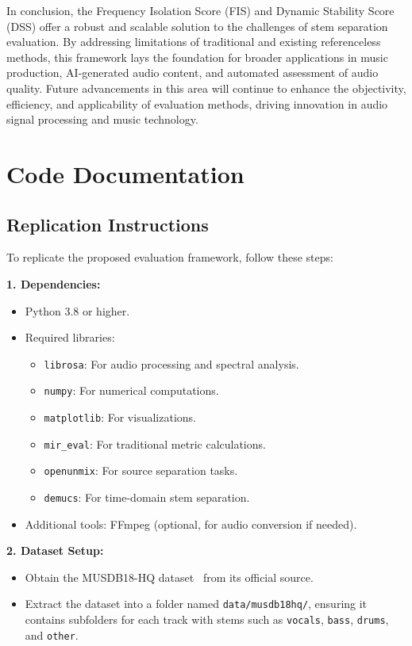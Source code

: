 \documentclass[10pt,twocolumn]{article}
\begin{document}
In conclusion, the Frequency Isolation Score (FIS) and Dynamic Stability Score (DSS) offer a robust and scalable solution to the challenges of stem separation evaluation. By addressing limitations of traditional and existing referenceless methods, this framework lays the foundation for broader applications in music production, AI-generated audio content, and automated assessment of audio quality. Future advancements in this area will continue to enhance the objectivity, efficiency, and applicability of evaluation methods, driving innovation in audio signal processing and music technology.


\section{Code Documentation}

\subsection{Replication Instructions}

To replicate the proposed evaluation framework, follow these steps:

\textbf{1. Dependencies:}
\begin{itemize}
    \item Python 3.8 or higher.
    \item Required libraries:
    \begin{itemize}
        \item \texttt{librosa}: For audio processing and spectral analysis.
        \item \texttt{numpy}: For numerical computations.
        \item \texttt{matplotlib}: For visualizations.
        \item \texttt{mir\_eval}: For traditional metric calculations.
        \item \texttt{openunmix}: For source separation tasks.
        \item \texttt{demucs}: For time-domain stem separation.
    \end{itemize}
    \item Additional tools: FFmpeg (optional, for audio conversion if needed).
\end{itemize}

\textbf{2. Dataset Setup:}
\begin{itemize}
    \item Obtain the MUSDB18-HQ dataset~\cite{musdb18-hq} from its official source.
    \item Extract the dataset into a folder named \texttt{data/musdb18hq/}, ensuring it contains subfolders for each track with stems such as \texttt{vocals}, \texttt{bass}, \texttt{drums}, and \texttt{other}.
\end{itemize}
\end{document}
